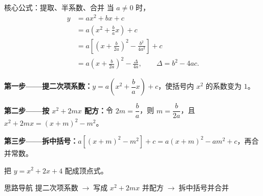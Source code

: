 \documentclass{exam-zh}
\begin{document}


\begin{eduSolutionBox}{核心公式：提取、半系数、合并}
  \begingroup
  \setlength{\parskip}{2.5mm}
当 $a\ne0$ 时，
\[
\begin{aligned}
y&=ax^2+bx+c\\
 &=a\left(x^2+\frac ba x\right)+c\\
 &=a\left[\left(x+\frac b{2a}\right)^2-\frac{b^2}{4a^2}\right]+c\\
 &=a\left(x+\frac b{2a}\right)^2-\frac{\Delta}{4a},
\qquad \Delta=b^2-4ac.
\end{aligned}
\]
\par
\textbf{第一步——提二次项系数：}$y=a\left(x^2+\dfrac ba x\right)+c$，使括号内 $x^2$ 的系数变为 $1$。\par
\textbf{第二步——按 $x^2+2mx$ 配方：}令 $2m=\dfrac ba$，则 $m=\dfrac b{2a}$，且 $x^2+2mx=(x+m)^2-m^2$。\par
\textbf{第三步——拆中括号：}$a[(x+m)^2-m^2]+c=a(x+m)^2-am^2+c$，再合并常数。\par
  \endgroup
\end{eduSolutionBox}




\begin{eduProblemBlock}[例题 1 · 首项系数为 1]
把 $y=x^2+2x+4$ 配成顶点式。
\end{eduProblemBlock}





\begin{eduAuxItem}{思路导航}
提二次项系数$\;\to\;$写成 $x^2+2mx$ 并配方$\;\to\;$拆中括号并合并\end{eduAuxItem}





\begin{eduDualExplain}
  \begin{eduExplainLeft}
  \end{eduExplainLeft}

  \begin{eduExplainRight}
  \end{eduExplainRight}
\end{eduDualExplain}
\end{document}
